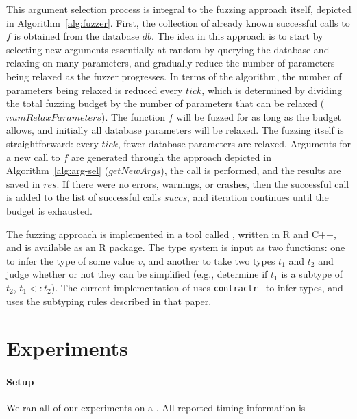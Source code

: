 \documentclass[sigplan,anonymous,review]{acmart}
\begin{document}
This argument selection process is integral to the fuzzing approach itself, depicted in Algorithm~\ref{alg:fuzzer}.
First, the collection of already known successful calls to $f$ is obtained from the database $db$.
The idea in this approach is to start by selecting new arguments essentially at random by querying the database and relaxing on many parameters, and gradually reduce the number of parameters being relaxed as the fuzzer progresses.
In terms of the algorithm, the number of parameters being relaxed is reduced every $tick$, which is determined by dividing the total fuzzing budget by the number of parameters that can be relaxed ($numRelaxParameters$).
The function $f$ will be fuzzed for as long as the budget allows, and initially all database parameters will be relaxed.
The fuzzing itself is straightforward: every $tick$, fewer database parameters are relaxed.
Arguments for a new call to $f$ are generated through the approach depicted in Algorithm~\ref{alg:arg-sel} ($getNewArgs$), the call is performed, and the results are saved in $res$.
If there were no errors, warnings, or crashes, then the successful call is added to the list of successful calls $succs$, and iteration continues until the budget is exhausted.



The fuzzing approach is implemented in a tool called \tool, written in R and C++, and is available as an R package.
The type system is input as two functions: one to infer the type of some value $v$, and another to take two types $t_1$ and $t_2$ and judge whether or not they can be simplified (e.g., determine if $t_1$ is a subtype of $t_2$, $t_1 <: t_2$). 
The current implementation of \tool uses {\tt contractr}~\cite{turcotte2020designing} to infer types, and uses the subtyping rules described in that paper.
 

\section{Experiments}
\label{sec:experiments}

\paragraph{Setup} 
We ran all of our experiments on a .
All reported timing information is 
\end{document}
